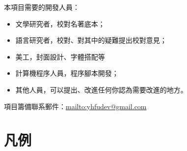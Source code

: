 本項目需要的開發人員：

\begin{itemize}
  \item 文學研究者，校對名著底本；
  \item 語言研究者，校對、對其中的疑難提出校對意見；
  \item 美工，封面設計、字體搭配等
  \item 計算機程序人員，程序腳本開發；%
  \item 其他人員，可以提出、改進任何你認為需要改進的地方。
\end{itemize}


項目籌備聯系郵件：\url{mailto:yhfudev@gmail.com}


\section*{凡例}

\jpmShowZhuInfo


